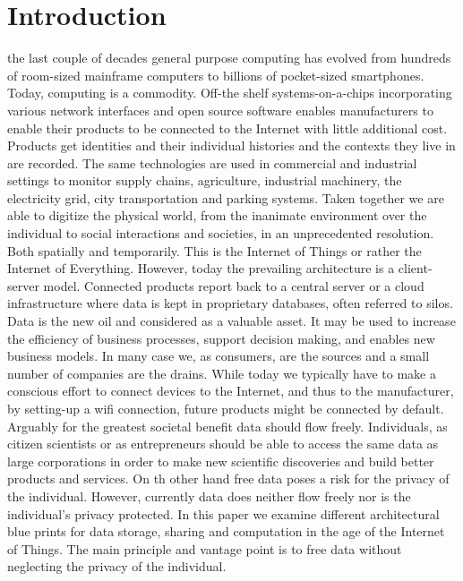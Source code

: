 \documentclass[journal]{IEEEtran}
\begin{document}
\section{Introduction}
% 
% 
% 
% 
 the last couple of decades general purpose computing has evolved from hundreds of room-sized mainframe computers to billions of pocket-sized smartphones. Today, computing is a commodity. Off-the shelf systems-on-a-chips incorporating various network interfaces and open source software enables manufacturers to enable their products to be connected to the Internet with little additional cost. Products get identities and their individual histories and the contexts they live in are recorded. The same technologies are used in commercial and industrial settings to monitor supply chains, agriculture, industrial machinery, the electricity grid, city transportation and parking systems. Taken together we are able to digitize the physical world, from the inanimate environment over the individual to social interactions and societies, in an unprecedented resolution. Both spatially and temporarily. This is the Internet of Things or rather the Internet of Everything. However, today the prevailing architecture is a client-server model. Connected products report back to a central server or a cloud infrastructure where data is kept in proprietary databases, often referred to silos. Data is the new oil and considered as a valuable asset. It may be used to increase the efficiency of business processes, support decision making, and enables new business models.
In many case we, as consumers, are the sources and a small number of companies are the drains. While today we typically have to make a conscious effort to connect devices to the Internet, and thus to the manufacturer, by setting-up a wifi connection, future products might be connected by default. Arguably for the greatest societal benefit data should flow freely. Individuals, as citizen scientists or as entrepreneurs should be able to access the same data as large corporations in order to make new scientific discoveries and build better products and services. On th other hand free data poses a risk for the privacy of the individual. However, currently data does neither flow freely nor is the individual's privacy protected. In this paper we examine different architectural blue prints for data storage, sharing and computation in the age of the Internet of Things. The main principle and vantage point is to free data without neglecting the privacy of the individual. 
\end{document}
